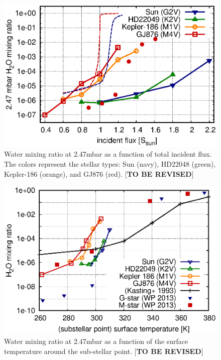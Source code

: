 \documentclass[11pt,numberedappendix,twocolappendix,]{emulateapj}
\def\preslevel{2.47}
\def\memo#1{\color{red}$[${\bf #1}$]$ \color{black}}
\begin{document}
\begin{figure}[!h]
    \begin{center}
    \includegraphics[width=\hsize]{fig/AqOH0TLS_xH2O_3mbar_all.eps}
    \end{center}
\caption{Water mixing ratio at \preslevel mbar as a function of total incident flux. The colors represent the stellar types: Sun (navy), HD22048 (green), Kepler-186 (orange), and GJ876 (red). \memo{TO BE REVISED}}                                                                                                             
\label{fig:xH2O_S0X}
\end{figure}

\begin{figure}[!h]
    \begin{center}
    \includegraphics[width=\hsize]{fig/AqOH0TLS_tsurf_xH2O_GCM_Kasting_WP.eps}
    \end{center}
\caption{Water mixing ratio at \preslevel mbar as a function of the surface temperature around the sub-stellar point. \memo{TO BE REVISED}}                                                                                                             
\label{fig:AqOH0TLS_tsurf_xH2O_GCM_Kasting_WP}
\end{figure}
\end{document}
